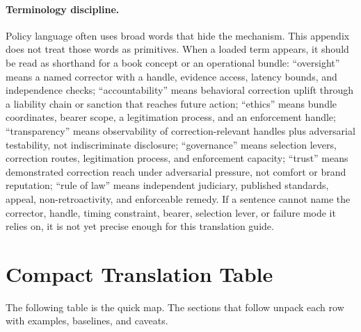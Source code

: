 \begin{refsection}
\paragraph{Terminology discipline.}
Policy language often uses broad words that hide the mechanism.
This appendix does not treat those words as primitives.
When a loaded term appears, it should be read as shorthand for a book concept or an operational bundle:
``oversight'' means a named corrector with a handle, evidence access, latency bounds, and independence checks;
``accountability'' means behavioral correction uplift through a liability chain or sanction that reaches future action;
``ethics'' means bundle coordinates, bearer scope, a legitimation process, and an enforcement handle;
``transparency'' means observability of correction-relevant handles plus adversarial testability, not indiscriminate disclosure;
``governance'' means selection levers, correction routes, legitimation process, and enforcement capacity;
``trust'' means demonstrated correction reach under adversarial pressure, not comfort or brand reputation;
``rule of law'' means independent judiciary, published standards, appeal, non-retroactivity, and enforceable remedy.
If a sentence cannot name the corrector, handle, timing constraint, bearer, selection lever, or failure mode it relies on, it is not yet precise enough for this translation guide.

\section{Compact Translation Table}
\label{sec:institutional-compact-table}

The following table is the quick map.
The sections that follow unpack each row with examples, baselines, and caveats.


\end{refsection}
